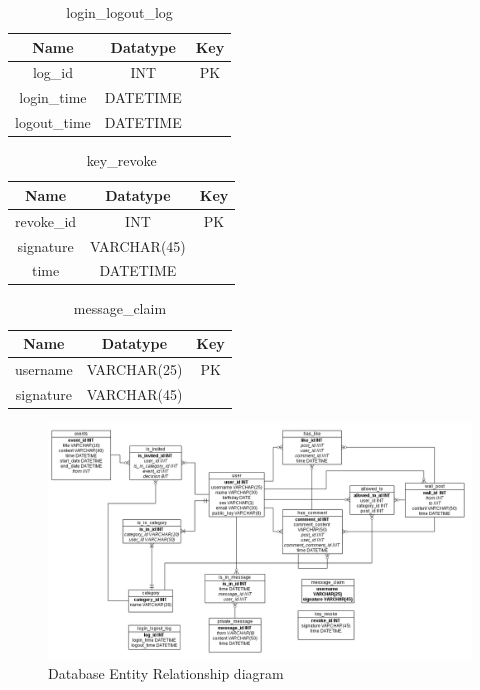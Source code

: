 \begin{table}[!ht]
\caption{login\_logout\_log}
\centering
\begin{tabular}{c c c}
\hline\hline
Name               & Datatype    & Key \\
\hline
log\_id            & INT         & PK  \\
login\_time        & DATETIME    &     \\
logout\_time       & DATETIME    &     \\
\hline
\end{tabular}
\label{table:nonlin}
\end{table}

\begin{table}[!ht]
\caption{key\_revoke}
\centering
\begin{tabular}{c c c}
\hline\hline
Name               & Datatype    & Key \\
\hline
revoke\_id         & INT          & PK  \\
signature          & VARCHAR(45)  &     \\
time               & DATETIME     &     \\
\hline
\end{tabular}
\label{table:nonlin}
\end{table}

\begin{table}[!ht]
\caption{message\_claim}
\centering
\begin{tabular}{c c c}
\hline\hline
Name               & Datatype    & Key \\
\hline
username           & VARCHAR(25) & PK  \\
signature          & VARCHAR(45) &     \\
\hline
\end{tabular}
\label{table:nonlin}
\end{table}

\clearpage

\begin{landscape}
\begin{figure}[h]
    
    \includegraphics[width=1.4\textwidth]{images/design/project_er_diagram.png}
    \caption{Database Entity Relationship diagram}
    \label{fig:db_er_diag}
\end{figure}
\end{landscape}